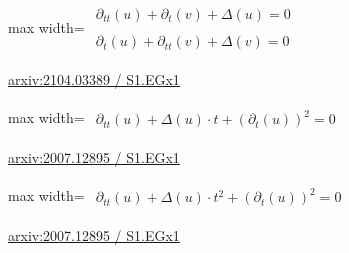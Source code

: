 \documentclass[UTF8,10pt,a4paper,fontset=mac]{ctexart}
\begin{document}
\begin{minipage}{\linewidth}\begin{center}\begin{adjustbox}{max width=\linewidth}$\displaystyle\begin{gathered}\begin{gathered}\partial_{tt}(u)+\partial_{t}(v)+\Delta(u)=0\end{gathered}\\[5pt]\begin{gathered}\partial_{t}(u)+\partial_{tt}(v)+\Delta(v)=0\end{gathered}\end{gathered}$\end{adjustbox}\end{center}{\small\href{https://arxiv.org/html/2104.03389#S1.EGx1}{arxiv:2104.03389 / S1.EGx1}}\par\end{minipage}\par\vspace{6mm}

\begin{minipage}{\linewidth}\begin{center}\begin{adjustbox}{max width=\linewidth}$\displaystyle\begin{gathered}\begin{gathered}\partial_{tt}(u)+\Delta(u)\cdot t+(\partial_{t}(u))^{2}=0\end{gathered}\end{gathered}$\end{adjustbox}\end{center}{\small\href{https://arxiv.org/html/2007.12895#S1.EGx1}{arxiv:2007.12895 / S1.EGx1}}\par\end{minipage}\par\vspace{6mm}

\begin{minipage}{\linewidth}\begin{center}\begin{adjustbox}{max width=\linewidth}$\displaystyle\begin{gathered}\begin{gathered}\partial_{tt}(u)+\Delta(u)\cdot t^{2}+(\partial_{t}(u))^{2}=0\end{gathered}\end{gathered}$\end{adjustbox}\end{center}{\small\href{https://arxiv.org/html/2007.12895#S1.EGx1}{arxiv:2007.12895 / S1.EGx1}}\par\end{minipage}\par\vspace{6mm}
\end{document}
